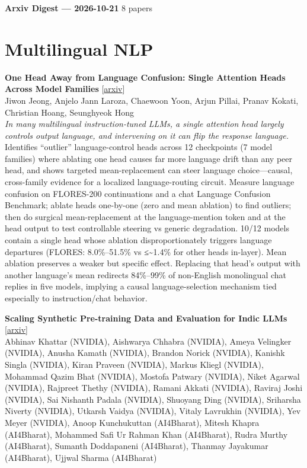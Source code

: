\documentclass[12pt,letterpaper]{article}
\begin{document}
{\footnotesize\textbf{Arxiv Digest --- 2026-10-21} \hfill 8 papers}

\smallskip

\section*{Multilingual NLP}

{\small\textbf{One Head Away from Language Confusion: Single Attention Heads Across Model Families}} {\scriptsize[\href{https://arxiv.org/abs/2610.25026}{arxiv}]}\\
{\scriptsize Jiwon Jeong, Anjelo Jann Laroza, Chaewoon Yoon, Arjun Pillai, Pranav Kokati, Christian Hoang, Seunghyeok Hong}\\

{\small\textit{In many multilingual instruction-tuned LLMs, a single attention head largely controls output language, and intervening on it can flip the response language.}}\\[1pt]
{\footnotesize Identifies ``outlier'' language-control heads across 12 checkpoints (7 model families) where ablating one head causes far more language drift than any peer head, and shows targeted mean-replacement can steer language choice---causal, cross-family evidence for a localized language-routing circuit. Measure language confusion on FLORES-200 continuations and a chat Language Confusion Benchmark; ablate heads one-by-one (zero and mean ablation) to find outliers; then do surgical mean-replacement at the language-mention token and at the head output to test controllable steering vs generic degradation. 10/12 models contain a single head whose ablation disproportionately triggers language departures (FLORES: 8.0\%--51.5\% vs ≤\textasciitilde{}1.4\% for other heads in-layer). Mean ablation preserves a weaker but specific effect. Replacing that head's output with another language's mean redirects 84\%--99\% of non-English monolingual chat replies in five models, implying a causal language-selection mechanism tied especially to instruction/chat behavior.}

\medskip

{\small\textbf{Scaling Synthetic Pre-training Data and Evaluation for Indic LLMs}} {\scriptsize[\href{https://arxiv.org/abs/2610.26006}{arxiv}]}\\
{\scriptsize Abhinav Khattar (NVIDIA), Aishwarya Chhabra (NVIDIA), Ameya Velingker (NVIDIA), Anusha Kamath (NVIDIA), Brandon Norick (NVIDIA), Kanishk Singla (NVIDIA), Kiran Praveen (NVIDIA), Markus Kliegl (NVIDIA), Mohammad Qazim Bhat (NVIDIA), Mostofa Patwary (NVIDIA), Niket Agarwal (NVIDIA), Rajpreet Thethy (NVIDIA), Ramani Akkati (NVIDIA), Raviraj Joshi (NVIDIA), Sai Nishanth Padala (NVIDIA), Shuoyang Ding (NVIDIA), Sriharsha Niverty (NVIDIA), Utkarsh Vaidya (NVIDIA), Vitaly Lavrukhin (NVIDIA), Yev Meyer (NVIDIA), Anoop Kunchukuttan (AI4Bharat), Mitesh Khapra (AI4Bharat), Mohammed Safi Ur Rahman Khan (AI4Bharat), Rudra Murthy (AI4Bharat), Sumanth Doddapaneni (AI4Bharat), Thanmay Jayakumar (AI4Bharat), Ujjwal Sharma (AI4Bharat)}\\
\end{document}
